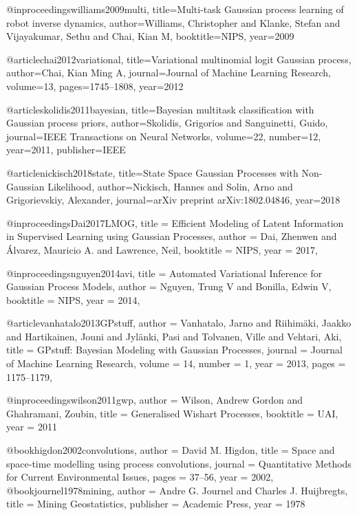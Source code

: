\documentclass[]{article}
\begin{document}
@inproceedings{williams2009multi,
	title={Multi-task {G}aussian process learning of robot inverse dynamics},
	author={Williams, Christopher and Klanke, Stefan and Vijayakumar, Sethu and Chai, Kian M},
	booktitle={NIPS},
	year={2009}
}

@article{chai2012variational,
	title={Variational multinomial logit {G}aussian process},
	author={Chai, Kian Ming A},
	journal={Journal of Machine Learning Research},
	volume={13},
	pages={1745--1808},
	year={2012}
}

@article{skolidis2011bayesian,
	title={Bayesian multitask classification with {G}aussian process priors},
	author={Skolidis, Grigorios and Sanguinetti, Guido},
	journal={IEEE Transactions on Neural Networks},
	volume={22},
	number={12},
	year={2011},
	publisher={IEEE}
}

@article{nickisch2018state,
	title={State Space {G}aussian Processes with Non-{G}aussian Likelihood},
	author={Nickisch, Hannes and Solin, Arno and Grigorievskiy, Alexander},
	journal={arXiv preprint arXiv:1802.04846},
	year={2018}
}

@inproceedings{Dai2017LMOG,
title = {Efficient Modeling of Latent Information in Supervised Learning using {G}aussian Processes},
author = {Dai, Zhenwen and \'{A}lvarez, Mauricio A. and Lawrence, Neil},
booktitle = {NIPS},
year = {2017},
}

@inproceedings{nguyen2014avi,
title = {Automated Variational Inference for {G}aussian Process Models},
author = {Nguyen, Trung V and Bonilla, Edwin V},
booktitle = {NIPS},
year = {2014},
}

@article{vanhatalo2013GPstuff,
 author = {Vanhatalo, Jarno and Riihim\"{a}ki, Jaakko and Hartikainen, Jouni and Jyl\"{a}nki, Pasi and Tolvanen, Ville and Vehtari, Aki},
 title = {{GP}stuff: {B}ayesian Modeling with {G}aussian Processes},
 journal = {Journal of Machine Learning Research},
 volume = {14},
 number = {1},
 year = {2013},
 pages = {1175--1179},
}

@inproceedings{wilson2011gwp,
 author = {Wilson, Andrew Gordon and Ghahramani, Zoubin},
 title = {Generalised {W}ishart Processes},
 booktitle = {UAI},
 year = {2011}
}

@book{higdon2002convolutions,
  author =   {David M. Higdon},
  title =    {Space and space-time modelling using process convolutions},
  journal =    {Quantitative Methods for Current Environmental Issues},
  pages =    {37--56},
  year = {2002},
}
@book{journel1978mining,
  author =   {Andre G. Journel and Charles J. Huijbregts},
  title =    {Mining Geostatistics},
  publisher =  {Academic Press},
  year =     {1978}
}
\end{document}
